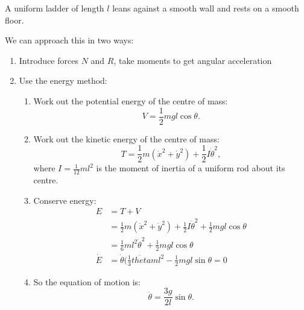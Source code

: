\documentclass[a4paper]{article}
\begin{document}
\begin{eg}
  A uniform ladder of length $l$ leans against a smooth wall and rests on a smooth floor.
  
  \begin{center}
  \end{center}
  We can approach this in two ways:

  \begin{enumerate}
  \item Introduce forces $N$ and $R$, take moments to get angular acceleration
  \item Use the energy method:
    \begin{enumerate}
    \item Work out the potential energy of the centre of mass: $$V = \frac{1}{2}mgl\cos\theta.$$
    \item Work out the kinetic energy of the centre of mass: $$T = \frac{1}{2}m(\dot{x}^2 + \dot{y}^2) + \frac{1}{2}I\dot{\theta}^2,$$ where $I=\frac{1}{12}ml^2$ is the moment of inertia of a uniform rod about its centre.
    \item Conserve energy:
      \begin{align*}
        E &= T + V \\
          &= \frac{1}{2}m(\dot{x}^2 + \dot{y}^2) + \frac{1}{2}I\dot{\theta}^2 + \frac{1}{2}mgl\cos\theta \\
          &= \frac{1}{6}ml^2\dot{\theta}^2 + \frac{1}{2}mgl\cos\theta \\
        \dot{E} &= \dot{\theta}(\frac{1}{3}\ddot{theta}ml^2 - \frac{1}{2}mgl\sin\theta = 0
      \end{align*}
    \item So the equation of motion is:
      $$\ddot{\theta} = \frac{3g}{2l}\sin\theta.$$
    \end{enumerate}
  \end{enumerate}
\end{eg}
\end{document}
